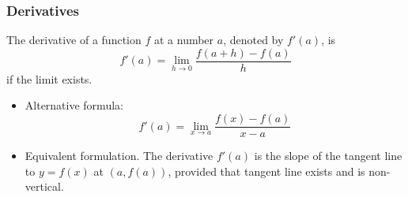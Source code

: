 \begin{frame}
\frametitle{Derivatives}
\begin{definition}[Derivative]
The derivative of a function $f$ at a number $a$, denoted by $f'(a)$, is
\[
f'(a) = \lim_{h\rightarrow 0}\frac{f(a+h)-f(a)}{h}
\]
if the limit exists.
\end{definition}
\begin{itemize}
\item<2-> Alternative formula:
\[
f'(a) = \lim_{x\rightarrow a}\frac{f(x)-f(a)}{x-a}
\]
\item<3-> Equivalent formulation. The derivative $f'(a)$ is the slope of the tangent line to $y=f(x)$ at $(a, f(a))$, provided that tangent line exists and is non-vertical.
\end{itemize}

\end{frame}
